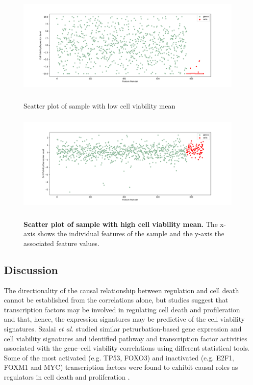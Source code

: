 \documentclass[bsc,frontabs,twoside,singlespacing,parskip,deptreport]{infthesis}     %
\let\Oldsubsection\subsection
\renewcommand{\subsection}{\FloatBarrier\Oldsubsection}
\begin{document}
\begin{figure}[h!]
\centering
\caption{Scatter plot of sample with low cell viability mean}
\includegraphics[height=5cm]{images/low_cell_mean.png}\label{low_mean}
\end{figure}
\begin{figure}[h!]
\centering
\caption{\textbf{Scatter plot of sample with high cell viability mean.} The x-axis shows the individual features of the sample and the y-axis the associated feature values.}
\includegraphics[height=5cm]{images/high_cell_mean.png}\label{high_mean}
\end{figure}
\subsection{Discussion}
The directionality of the causal relationship between regulation and cell death cannot be established from the correlations alone, but studies suggest that transcription factors may be involved in regulating cell death and profileration and that, hence, the expression signatures may be predictive of the cell viability signatures. Szalai \textit{et al.} studied similar petrurbation-based gene expression and cell viability signatures and identified pathway and transcription factor activities associated with the gene–cell viability correlations using different statistical tools. Some of the most activated (e.g. TP53, FOXO3) and inactivated (e.g. E2F1, FOXM1 and MYC) transcription factors were found to exhibit causal roles as regulators in cell death and proliferation \cite{szalai_signatures_2019}.
\end{document}
